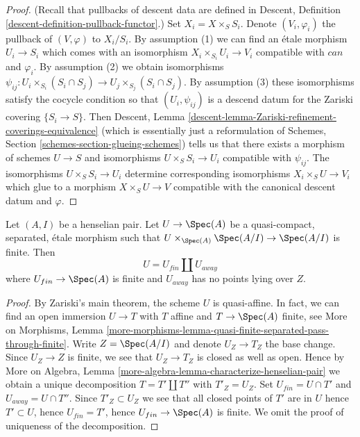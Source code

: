 \begin{proof}
(Recall that pullbacks of descent data are defined in
Descent, Definition \ref{descent-definition-pullback-functor}.)
Set $X_i = X \times_S S_i$. Denote $(V_i, \varphi_i)$ the pullback
of $(V, \varphi)$ to $X_i/S_i$.
By assumption (1) we can find an \'etale morphism $U_i \to S_i$
which comes with an isomorphism $X_i \times_{S_i} U_i \to V_i$ compatible with
$can$ and $\varphi_i$. By assumption (2) we obtain isomorphisms
$\psi_{ij} : U_i \times_{S_i} (S_i \cap S_j) \to
U_j \times_{S_j} (S_i \cap S_j)$.
By assumption (3) these isomorphisms satisfy the cocycle condition
so that $(U_i, \psi_{ij})$ is a descend datum for the
Zariski covering $\{S_i \to S\}$. Then Descent, Lemma
\ref{descent-lemma-Zariski-refinement-coverings-equivalence}
(which is essentially just a reformulation of
Schemes, Section \ref{schemes-section-glueing-schemes})
tells us that there exists a morphism of schemes $U \to S$
and isomorphisms $U \times_S S_i \to U_i$ compatible
with $\psi_{ij}$. The isomorphisms $U \times_S S_i \to U_i$
determine corresponding isomorphisms $X_i \times_S U \to V_i$
which glue to a morphism $X \times_S U \to V$ compatible
with the canonical descent datum and $\varphi$.
\end{proof}

\begin{lemma}
\label{lemma-split-henselian}
Let $(A, I)$ be a henselian pair. Let $U \to \Spec(A)$ be a
quasi-compact, separated, \'etale morphism such that
$U \times_{\Spec(A)} \Spec(A/I) \to \Spec(A/I)$ is finite.
Then
$$
U = U_{fin} \amalg U_{away}
$$
where $U_{fin} \to \Spec(A)$ is finite and $U_{away}$ has
no points lying over $Z$.
\end{lemma}

\begin{proof}
By Zariski's main theorem, the scheme $U$ is quasi-affine.
In fact, we can find an open immersion $U \to T$ with $T$ affine and
$T \to \Spec(A)$ finite, see More on Morphisms, Lemma
\ref{more-morphisms-lemma-quasi-finite-separated-pass-through-finite}.
Write $Z = \Spec(A/I)$ and denote $U_Z \to T_Z$ the base change.
Since $U_Z \to Z$ is finite, we see that $U_Z \to T_Z$ is closed
as well as open. Hence by
More on Algebra, Lemma \ref{more-algebra-lemma-characterize-henselian-pair}
we obtain a unique decomposition $T = T' \amalg T''$ with $T'_Z = U_Z$.
Set $U_{fin} = U \cap T'$ and $U_{away} = U \cap T''$. Since
$T'_Z \subset U_Z$ we see that all closed points of $T'$ are in $U$
hence $T' \subset U$, hence $U_{fin} = T'$, hence $U_{fin} \to \Spec(A)$
is finite. We omit the proof
of uniqueness of the decomposition.
\end{proof}

